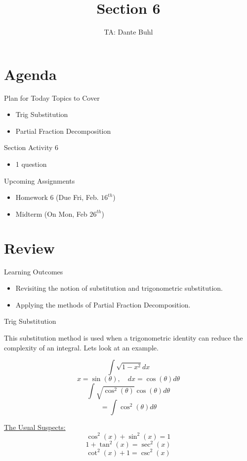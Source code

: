\documentclass{beamer}
\title{Section 6}
\author{TA: Dante Buhl}
\institute{UCSC Math-19B}
\begin{document}
\newcommand{\bmp}[1]{\begin{minipage}{#1\textwidth}}
\newcommand{\emp}{\end{minipage}}


\frame{\titlepage}

\section{Agenda}
\begin{frame}{Plan for Today}
    Topics to Cover
    \begin{itemize}
        \item Trig Substitution
        \item Partial Fraction Decomposition
    \end{itemize}
    Section Activity 6
    \begin{itemize}
        \item 1 question
    \end{itemize}
    Upcoming Assignments
    \begin{itemize}
        \item Homework 6 (Due Fri, Feb. $16^{th}$)
        \item Midterm (On Mon, Feb $26^{th}$)
    \end{itemize}
\end{frame}


\section{Review}
\begin{frame}{Learning Outcomes}
    \begin{itemize}
        \item Revisiting the notion of substitution and trigonometric substitution.
        \item Applying the methods of Partial Fraction Decomposition.
    \end{itemize}
\end{frame}

\begin{frame}{Trig Substitution}

This substitution method is used when a trigonometric identity can reduce the complexity of an integral. Lets look at an example. 
\bmp{.45}
\[
    \int \sqrt{1 - x^2}dx 
\]
\footnotesize
\[
    x = \sin(\theta), \quad dx = \cos(\theta)d\theta
\]
\normalsize
\[
    \int \sqrt{\cos^2(\theta)}\cos(\theta)d\theta
\]
\[
    = \int \cos^2(\theta)d\theta
\]
\emp
\bmp{.45}
\centering 
\underline{The Usual Suspects:}
\[
    \cos^2(x) + \sin^2(x) = 1
\]
\[
    1 + \tan^2(x) = \sec^2(x)   
\]
\[
    \cot^2(x) + 1 = \csc^2(x)
\]

\emp
\end{frame}
\end{document}
